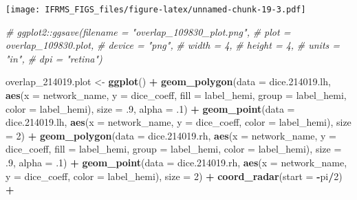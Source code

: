 \documentclass[
]{article}
\newenvironment{Shaded}{\begin{snugshade}}{\end{snugshade}}
\newcommand{\CommentTok}[1]{\textcolor[rgb]{0.56,0.35,0.01}{\textit{#1}}}
\newcommand{\DataTypeTok}[1]{\textcolor[rgb]{0.13,0.29,0.53}{#1}}
\newcommand{\DecValTok}[1]{\textcolor[rgb]{0.00,0.00,0.81}{#1}}
\newcommand{\FloatTok}[1]{\textcolor[rgb]{0.00,0.00,0.81}{#1}}
\newcommand{\KeywordTok}[1]{\textcolor[rgb]{0.13,0.29,0.53}{\textbf{#1}}}
\newcommand{\NormalTok}[1]{#1}
\newcommand{\OperatorTok}[1]{\textcolor[rgb]{0.81,0.36,0.00}{\textbf{#1}}}
\newcommand{\StringTok}[1]{\textcolor[rgb]{0.31,0.60,0.02}{#1}}
\begin{document}
\texttt{[image: IFRMS\_FIGS\_files/figure-latex/unnamed-chunk-19-3.pdf]}

\begin{Shaded}
\begin{Highlighting}[]
\CommentTok{# ggplot2::ggsave(filename = "overlap_109830_plot.png",}
\CommentTok{#                 plot = overlap_109830.plot,}
\CommentTok{#                 device = "png",}
\CommentTok{#                 width = 4,}
\CommentTok{#                 height = 4, }
\CommentTok{#                 units = "in",}
\CommentTok{#                 dpi = "retina")}


\NormalTok{overlap_}\FloatTok{214019.}\NormalTok{plot <-}\StringTok{ }\KeywordTok{ggplot}\NormalTok{() }\OperatorTok{+}\StringTok{  }
\StringTok{  }\KeywordTok{geom_polygon}\NormalTok{(}\DataTypeTok{data =}\NormalTok{ dice.}\FloatTok{214019.}\NormalTok{lh, }\KeywordTok{aes}\NormalTok{(}\DataTypeTok{x =}\NormalTok{ network_name, }\DataTypeTok{y =}\NormalTok{ dice_coeff, }\DataTypeTok{fill =}\NormalTok{ label_hemi, }\DataTypeTok{group =}
\NormalTok{                                           label_hemi, }\DataTypeTok{color =}\NormalTok{ label_hemi), }\DataTypeTok{size =} \FloatTok{.9}\NormalTok{, }\DataTypeTok{alpha =} \FloatTok{.1}\NormalTok{) }\OperatorTok{+}
\StringTok{  }\KeywordTok{geom_point}\NormalTok{(}\DataTypeTok{data =}\NormalTok{ dice.}\FloatTok{214019.}\NormalTok{lh, }\KeywordTok{aes}\NormalTok{(}\DataTypeTok{x =}\NormalTok{ network_name, }\DataTypeTok{y =}\NormalTok{ dice_coeff, }\DataTypeTok{color =}\NormalTok{ label_hemi), }\DataTypeTok{size =} \DecValTok{2}\NormalTok{) }\OperatorTok{+}\StringTok{ }
\StringTok{  }
\StringTok{  }\KeywordTok{geom_polygon}\NormalTok{(}\DataTypeTok{data =}\NormalTok{ dice.}\FloatTok{214019.}\NormalTok{rh, }\KeywordTok{aes}\NormalTok{(}\DataTypeTok{x =}\NormalTok{ network_name, }\DataTypeTok{y =}\NormalTok{ dice_coeff, }\DataTypeTok{fill =}\NormalTok{ label_hemi, }\DataTypeTok{group =}
\NormalTok{                                           label_hemi, }\DataTypeTok{color =}\NormalTok{ label_hemi), }\DataTypeTok{size =} \FloatTok{.9}\NormalTok{, }\DataTypeTok{alpha =} \FloatTok{.1}\NormalTok{) }\OperatorTok{+}
\StringTok{  }\KeywordTok{geom_point}\NormalTok{(}\DataTypeTok{data =}\NormalTok{ dice.}\FloatTok{214019.}\NormalTok{rh, }\KeywordTok{aes}\NormalTok{(}\DataTypeTok{x =}\NormalTok{ network_name, }\DataTypeTok{y =}\NormalTok{ dice_coeff, }\DataTypeTok{color =}\NormalTok{ label_hemi), }\DataTypeTok{size =} \DecValTok{2}\NormalTok{) }\OperatorTok{+}\StringTok{ }
\StringTok{  }
\StringTok{  }\KeywordTok{coord_radar}\NormalTok{(}\DataTypeTok{start =} \OperatorTok{-}\NormalTok{pi}\OperatorTok{/}\DecValTok{2}\NormalTok{) }\OperatorTok{+}

\end{Highlighting}
\end{Shaded}
\end{document}
